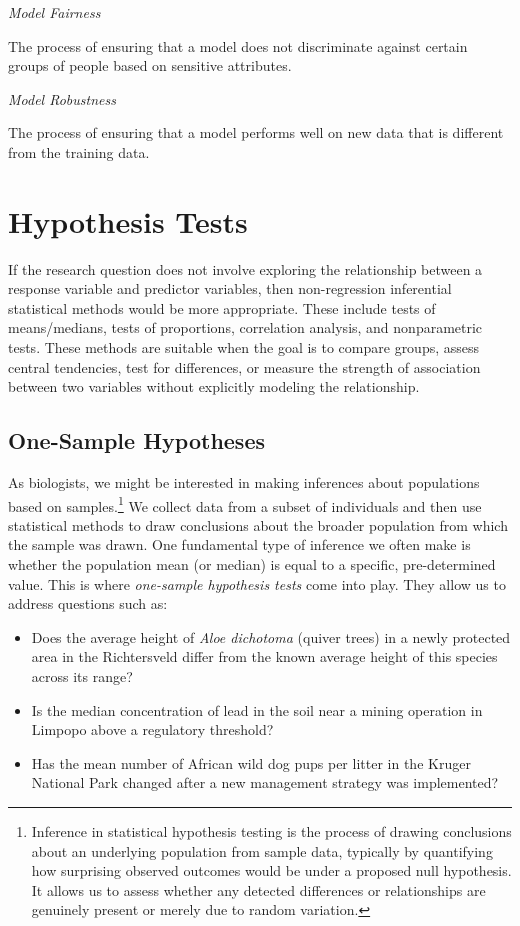 \documentclass[
  letterpaper,
]{book}
\providecommand{\tightlist}{%
  \setlength{\itemsep}{0pt}\setlength{\parskip}{0pt}}\usepackage{longtable,booktabs,array}
\begin{document}
\emph{Model Fairness}

The process of ensuring that a model does not discriminate against
certain groups of people based on sensitive attributes.

\emph{Model Robustness}

The process of ensuring that a model performs well on new data that is
different from the training data.

\part{Hypothesis Tests}

If the research question does not involve exploring the relationship
between a response variable and predictor variables, then non-regression
inferential statistical methods would be more appropriate. These include
tests of means/medians, tests of proportions, correlation analysis, and
nonparametric tests. These methods are suitable when the goal is to
compare groups, assess central tendencies, test for differences, or
measure the strength of association between two variables without
explicitly modeling the relationship.

\chapter{One-Sample Hypotheses}\label{sec-t-tests}

As biologists, we might be interested in making inferences about
populations based on samples.\footnote{Inference in statistical
  hypothesis testing is the process of drawing conclusions about an
  underlying population from sample data, typically by quantifying how
  surprising observed outcomes would be under a proposed null
  hypothesis. It allows us to assess whether any detected differences or
  relationships are genuinely present or merely due to random variation.}
We collect data from a subset of individuals and then use statistical
methods to draw conclusions about the broader population from which the
sample was drawn. One fundamental type of inference we often make is
whether the population mean (or median) is equal to a specific,
pre-determined value. This is where \emph{one-sample hypothesis tests}
come into play. They allow us to address questions such as:

\vspace{6pt}

\begin{itemize}
\tightlist
\item
  Does the average height of \emph{Aloe dichotoma} (quiver trees) in a
  newly protected area in the Richtersveld differ from the known average
  height of this species across its range?
\item
  Is the median concentration of lead in the soil near a mining
  operation in Limpopo above a regulatory threshold?
\item
  Has the mean number of African wild dog pups per litter in the Kruger
  National Park changed after a new management strategy was implemented?
\end{itemize}
\end{document}
